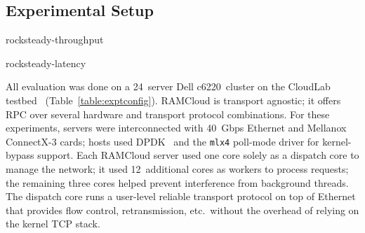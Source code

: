 \subsection{Experimental Setup}
\label{sec:setup}

 {rocksteady-throughput}

 {rocksteady-latency}

All evaluation was done on a 24~server Dell c6220~cluster on the CloudLab
testbed~\cite{cloudlab} (Table~\ref{table:exptconfig}).  RAMCloud is transport
agnostic; it offers RPC over several hardware and transport protocol
combinations.  For these experiments, servers were interconnected with 40~Gbps
Ethernet and Mellanox ConnectX-3 cards; hosts used DPDK~\cite{dpdk} and
the \texttt{mlx4} poll-mode driver for kernel-bypass support.  Each RAMCloud
server used one core solely as a dispatch core to manage the network; it used
12~additional cores as workers to process requests; the remaining
three cores helped prevent interference from background threads. The
dispatch core runs a user-level reliable transport protocol on top of
Ethernet that provides flow control, retransmission, etc.\ without the
overhead of relying on the kernel TCP stack.

%

